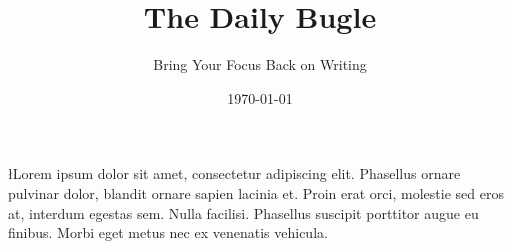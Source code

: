 \documentclass{news}
\title     {The Daily Bugle}
\subtitle  {Bring Your Focus Back on Writing}
\date      {\today}
\begin{document}
\begin{multicols}{4}


\l{L}orem ipsum dolor sit amet, consectetur adipiscing elit. Phasellus ornare pulvinar dolor, blandit ornare sapien lacinia et. Proin erat orci, molestie sed eros at, interdum egestas sem. Nulla facilisi. Phasellus suscipit porttitor augue eu finibus. Morbi eget metus nec ex venenatis vehicula.

\lipsum[1-15]
\newpage
\lipsum[1-15]

\end{multicols}
\end{document}
